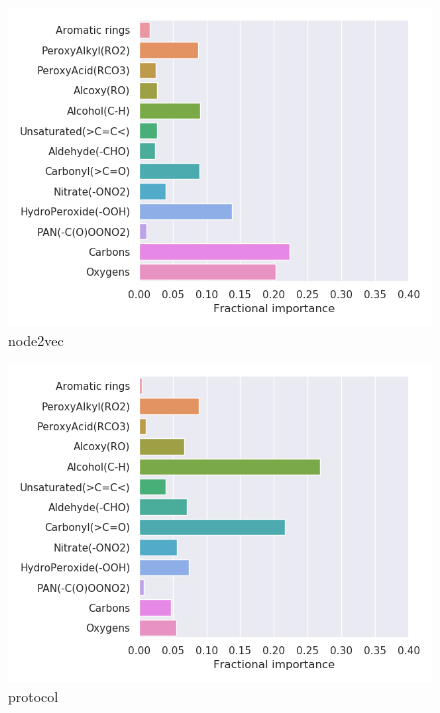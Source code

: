 \begin{subfigure}[b]{0.5\textwidth}
    \centering
    \includegraphics[width=\textwidth]{outputs/t-SNE/node2vec/legend.png}
    \caption{node2vec}
    \label{fig:legend_t-SNE_node2vec}
\end{subfigure}
\begin{subfigure}[b]{0.5\textwidth}
    \centering
    \includegraphics[width=\textwidth]{outputs/t-SNE/protocol/legend.png}
    \caption{protocol}
    \label{fig:legend_t-SNE_protocol}
\end{subfigure}
